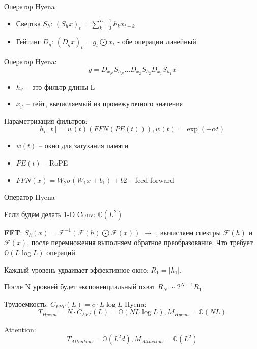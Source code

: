 \documentclass[10pt]{beamer}
\theoremstyle{definition}
\begin{document}
\begin{frame}{Оператор Hyena}
\begin{itemize}
    \item Свертка $S_h$: $(S_hx)_t = \sum\limits_{k=0}^{L-1} h_k x_{t-k}$
    \item Гейтинг $D_g$: $(D_gx)_{t} = g_t \bigodot x_t$ - обе операции линейный
\end{itemize}

Оператор Hyena:
\begin{equation*}
    y = D_{x_N}S_{h_N} ... D_{x_2}S_{h_2}D_{x_1}S_{h_1}x
\end{equation*}
\begin{itemize}
    \item $h_{i'}$ -- это фильтр длины L
    \item $x_{i'}$ -- гейт, вычисляемый из промежуточного значения
\end{itemize}

Параметризация фильтров:
\begin{equation*}
    h_i[t] = w(t) (FFN(PE(t))), w(t) = \exp(-\alpha t)
\end{equation*}
\begin{itemize}
    \item $w(t)$ -- окно для затухания памяти
    \item $PE(t)$ -- RoPE
    \item $FFN(x) = W_2 \sigma(W_1 x + b_1)+b2$ -- feed-forward
\end{itemize}

\end{frame}

\begin{frame}{Оператор Hyena}

Если будем делать 1-D Conv: $\mathbb{O}(L^2)$

\textbf{FFT}: $S_h(x) = \mathcal{F}^{-1}(\mathcal{F}(h) \bigodot \mathcal{F}(x))$ $\rightarrow$ , вычисляем спектры $\mathcal{F}(h)$ и $\mathcal{F}(x)$, после перемножения выполняем обратное преобразование. Что требует $\mathbb{O}(L \log L)$ операций.

Каждый уровень удваивает эффективное окно: $R_1 = |h_1|$.

После N уровней будет экспоненциальный охват $R_N \sim 2^{N-1} R_1$.

Трудоемкость:
$C_{FFT}(L) = c \cdot L \log L$
Hyena:
\begin{equation*}
    T_{Hyena} = N \cdot C_{FFT}(L) = \mathbb{O}(NL\log L), M_{Hyena} = \mathbb{O}(NL)
\end{equation*}

Attention:
\begin{equation*}
    T_{Attention} = \mathbb{O}(L^2d), M_{Attnetion} = \mathbb{O}(L^2)    
\end{equation*}
\end{frame}
\end{document}
